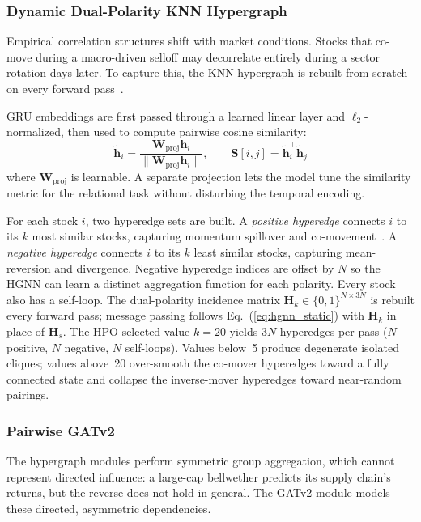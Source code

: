 \documentclass[journal]{IEEEtran}
\begin{document}
\subsubsection{Dynamic Dual-Polarity KNN Hypergraph}

Empirical correlation structures shift with market conditions. Stocks
that co-move during a macro-driven selloff may decorrelate entirely
during a sector rotation days later. To capture this, the KNN
hypergraph is rebuilt from scratch on every forward
pass~\cite{wang2019dynamic}.

GRU embeddings are first passed through a learned linear layer and
$\ell_2$-normalized, then used to compute pairwise cosine similarity:
\begin{equation}
  \tilde{\mathbf{h}}_i = \frac{\mathbf{W}_{\mathrm{proj}}\mathbf{h}_i}
    {\|\mathbf{W}_{\mathrm{proj}}\mathbf{h}_i\|},\qquad
  \mathbf{S}[i,j] = \tilde{\mathbf{h}}_i^\top\tilde{\mathbf{h}}_j
  \label{eq:cosine_sim}
\end{equation}
where $\mathbf{W}_{\mathrm{proj}}$ is learnable. A separate projection
lets the model tune the similarity metric for the relational task
without disturbing the temporal encoding.

For each stock $i$, two hyperedge sets are built. A \textit{positive
hyperedge} connects $i$ to its $k$ most similar stocks, capturing
momentum spillover and co-movement~\cite{jegadeesh1993returns}. A
\textit{negative hyperedge} connects $i$ to its $k$ least similar
stocks, capturing mean-reversion and divergence. Negative hyperedge
indices are offset by $N$ so the HGNN can learn a distinct aggregation
function for each polarity. Every stock also has a self-loop. The
dual-polarity incidence matrix $\mathbf{H}_k\in\{0,1\}^{N\times3N}$
is rebuilt every forward pass; message passing follows
Eq.~(\ref{eq:hgnn_static}) with $\mathbf{H}_k$ in place of
$\mathbf{H}_s$. The HPO-selected value $k=20$ yields $3N$ hyperedges
per pass ($N$ positive, $N$ negative, $N$ self-loops). Values below~5
produce degenerate isolated cliques; values above~20 over-smooth the
co-mover hyperedges toward a fully connected state and collapse the
inverse-mover hyperedges toward near-random pairings.

\subsubsection{Pairwise GATv2}

The hypergraph modules perform symmetric group aggregation, which
cannot represent directed influence: a large-cap bellwether predicts
its supply chain's returns, but the reverse does not hold in general.
The GATv2 module models these directed, asymmetric dependencies.
\end{document}

